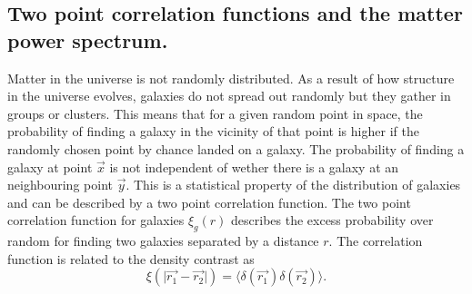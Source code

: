 \subsection{Two point correlation functions and the matter power spectrum.} \label{sec:corrtheory}
Matter in the universe is not randomly distributed. As a result of how structure in the universe evolves, galaxies
do not spread out randomly but they gather in groups or clusters. This means that for a given random point in space, the probability of finding
a galaxy in the vicinity of that point is higher if the randomly chosen point by chance landed on a galaxy. The probability of finding a galaxy
at point $\vec{x}$ is not independent of wether there is a galaxy at an neighbouring point $\vec{y}$. This is a statistical property of the distribution
of galaxies and can be described by a two point correlation function. The two point correlation function for galaxies $\xi_{g}(r)$ describes the excess probability
over random for finding two galaxies separated by a distance $r$. The correlation function is related to the density contrast as
\begin{equation}
    \xi(\vert\vec{r_1}-\vec{r_2}\vert)=\langle\delta(\vec{r_1})\delta(\vec{r_2})\rangle.
\end{equation}

